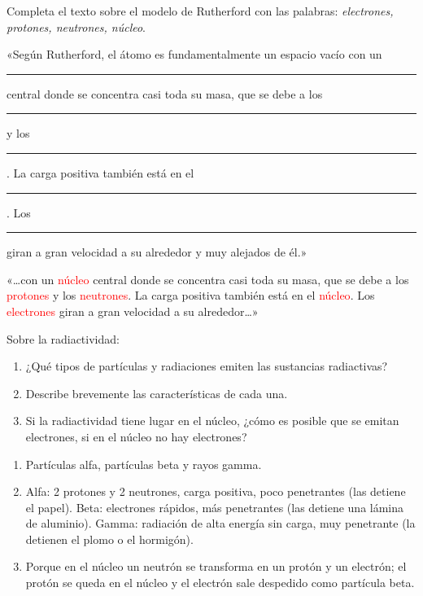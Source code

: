 \begin{exercise}
    Completa el texto sobre el modelo de Rutherford con las palabras: \emph{electrones, protones, neutrones, núcleo}.

    «Según Rutherford, el átomo es fundamentalmente un espacio vacío con un \rule{1.5cm}{0.4pt} central donde se concentra casi toda su masa, que se debe a los \rule{1.5cm}{0.4pt} y los \rule{1.5cm}{0.4pt}. La carga positiva también está en el \rule{1.5cm}{0.4pt}. Los \rule{1.5cm}{0.4pt} giran a gran velocidad a su alrededor y muy alejados de él.»
    \begin{solu}
        «\ldots con un \textcolor{red}{núcleo} central donde se concentra casi toda su masa, que se debe a los \textcolor{red}{protones} y los \textcolor{red}{neutrones}. La carga positiva también está en el \textcolor{red}{núcleo}. Los \textcolor{red}{electrones} giran a gran velocidad a su alrededor\ldots»
    \end{solu}
\end{exercise}

\begin{exercise}
    Sobre la radiactividad:
    \begin{enumerate}[label=\alph*)]
        \item ¿Qué tipos de partículas y radiaciones emiten las sustancias radiactivas?
        \item Describe brevemente las características de cada una.
        \item Si la radiactividad tiene lugar en el núcleo, ¿cómo es posible que se emitan electrones, si en el núcleo no hay electrones?
    \end{enumerate}
    \begin{solu}
        \begin{enumerate}[label=\alph*)]
            \item Partículas alfa, partículas beta y rayos gamma.
            \item Alfa: 2 protones y 2 neutrones, carga positiva, poco penetrantes (las detiene el papel). Beta: electrones rápidos, más penetrantes (las detiene una lámina de aluminio). Gamma: radiación de alta energía sin carga, muy penetrante (la detienen el plomo o el hormigón).
            \item Porque en el núcleo un neutrón se transforma en un protón y un electrón; el protón se queda en el núcleo y el electrón sale despedido como partícula beta.
        \end{enumerate}
    \end{solu}
\end{exercise}

